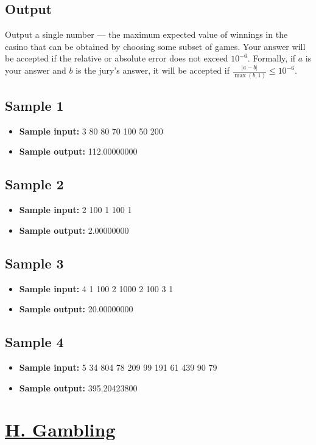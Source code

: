 \documentclass{article}
\begin{document}
\subsection*{Output}
 Output a single number — the maximum expected value of winnings in the casino that can be obtained by choosing some subset of games. Your answer will be accepted if the relative or absolute error does not exceed $10^{-6}$. Formally, if $a$ is your answer and $b$ is the jury's answer, it will be accepted if $\frac{|a-b|}{\max(b, 1)} \le 10^{-6}$.

\subsection*{Sample 1}
\begin{itemize}
\item \textbf{Sample input:} 
3
80 80
70 100
50 200
\item \textbf{Sample output:} 
112.00000000
\end{itemize}
\subsection*{Sample 2}
\begin{itemize}
\item \textbf{Sample input:} 
2
100 1
100 1
\item \textbf{Sample output:} 
2.00000000
\end{itemize}
\subsection*{Sample 3}
\begin{itemize}
\item \textbf{Sample input:} 
4
1 100
2 1000
2 100
3 1
\item \textbf{Sample output:} 
20.00000000
\end{itemize}
\subsection*{Sample 4}
\begin{itemize}
\item \textbf{Sample input:} 
5
34 804
78 209
99 191
61 439
90 79
\item \textbf{Sample output:} 
395.20423800
\end{itemize}
\section{\href{https://codeforces.com/problemset/problem/1692/H}{H. Gambling}}
\end{document}
